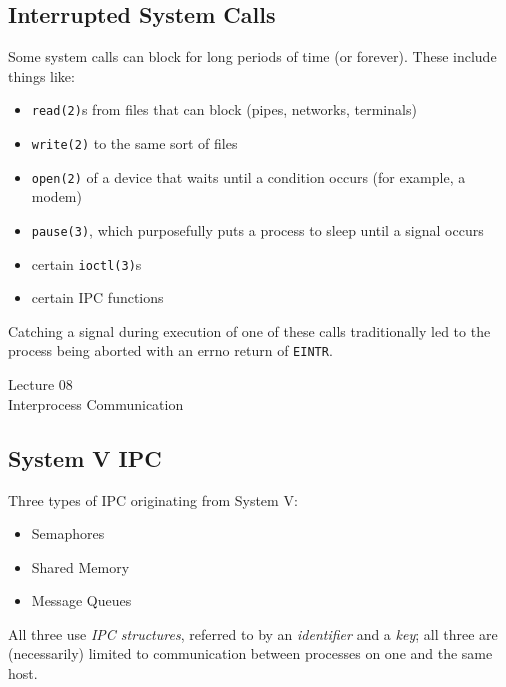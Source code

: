 \documentclass[xga]{xdvislides}
\begin{document}
\subsection{Interrupted System Calls}

Some system calls can block for long periods of time (or forever). These
include things like:

\begin{itemize}
	\item {\tt read(2)}s from files that can block (pipes, networks, terminals)
	\item {\tt write(2)} to the same sort of files
	\item {\tt open(2)} of a device that waits until a condition occurs (for example, a modem)
	\item {\tt pause(3)}, which purposefully puts a process to sleep until a signal occurs
	\item certain {\tt ioctl(3)}s
	\item certain IPC functions
\end{itemize}

Catching a signal during execution of one of these calls traditionally led
to the process being aborted with an errno return of {\tt EINTR}.

\newpage
\vspace*{\fill}
\begin{center}
  \Hugesize
    Lecture 08
	\hspace*{5mm}\blueline\\ [1em]
	Interprocess Communication
  \Normalsize
\end{center}
\vspace*{\fill}

\subsection{System V IPC}
Three types of IPC originating from System V:
\begin{itemize}
	\item Semaphores
	\item Shared Memory
	\item Message Queues
\end{itemize}
\vspace{.5in}

All three use {\em IPC structures}, referred to by an {\em identifier} and a
{\em key}; all three are (necessarily) limited to communication between
processes on one and the same host.
\\
\end{document}
